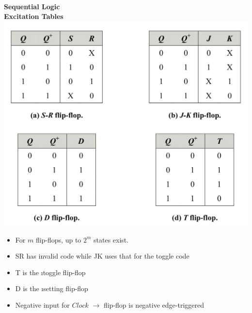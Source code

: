 \documentclass[a4paper]{article} \usepackage[backend=biber, style=numeric, sorting=none]{biblatex}
\begin{document}
\begin{multicols*}{4}
{\small\textbf{Sequential Logic }}
\\ \textbf{{Excitation Tables}}
\\ {\centering \includegraphics[scale=0.10]{excitationTables}}
\begin{itemize}[leftmargin=*]
\itemsep -0.5em
\item For $m$ flip-flops, up to $2^m$ states exist.
\item SR has invalid code while JK uses that for the toggle code
\item T is the {\i toggle} flip-flop
\item D is the {\i setting} flip-flop
\item Negative input for $Clock$ $\rightarrow$ flip-flop is negative edge-triggered
\end{itemize}


\end{multicols*}
\end{document}
